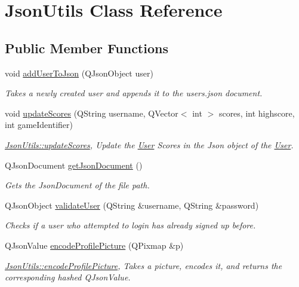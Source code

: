 \hypertarget{classJsonUtils}{}\section{Json\+Utils Class Reference}
\label{classJsonUtils}
\subsection*{Public Member Functions}
\begin{DoxyCompactItemize}
\item 
void \hyperlink{classJsonUtils_a9626b00d2b338602731abac985a77063}{add\+User\+To\+Json} (Q\+Json\+Object user)
\begin{DoxyCompactList}\small\item\em Takes a newly created user and appends it to the users.\+json document. \end{DoxyCompactList}\item 
void \hyperlink{classJsonUtils_aa59b55bcdf1b0a9ab2726d1da6cf9eb8}{update\+Scores} (Q\+String username, Q\+Vector$<$ int $>$ scores, int highscore, int game\+Identifier)
\begin{DoxyCompactList}\small\item\em \hyperlink{classJsonUtils_aa59b55bcdf1b0a9ab2726d1da6cf9eb8}{Json\+Utils\+::update\+Scores}, Update the \hyperlink{classUser}{User} Scores in the Json object of the \hyperlink{classUser}{User}. \end{DoxyCompactList}\item 
Q\+Json\+Document \hyperlink{classJsonUtils_a119512273e8b9dc8ea46e88811479705}{get\+Json\+Document} ()
\begin{DoxyCompactList}\small\item\em Gets the Json\+Document of the file path. \end{DoxyCompactList}\item 
Q\+Json\+Object \hyperlink{classJsonUtils_ae71b2b3eeaf9d1d0a7dce02cec7684ea}{validate\+User} (Q\+String \&username, Q\+String \&password)
\begin{DoxyCompactList}\small\item\em Checks if a user who attempted to login has already signed up before. \end{DoxyCompactList}\item 
Q\+Json\+Value \hyperlink{classJsonUtils_ae1a169f74290c719847414f70d2cf970}{encode\+Profile\+Picture} (Q\+Pixmap \&p)
\begin{DoxyCompactList}\small\item\em \hyperlink{classJsonUtils_ae1a169f74290c719847414f70d2cf970}{Json\+Utils\+::encode\+Profile\+Picture}, Takes a picture, encodes it, and returns the corresponding hashed Q\+Json\+Value. \end{DoxyCompactList}\item 

\end{DoxyCompactItemize}
